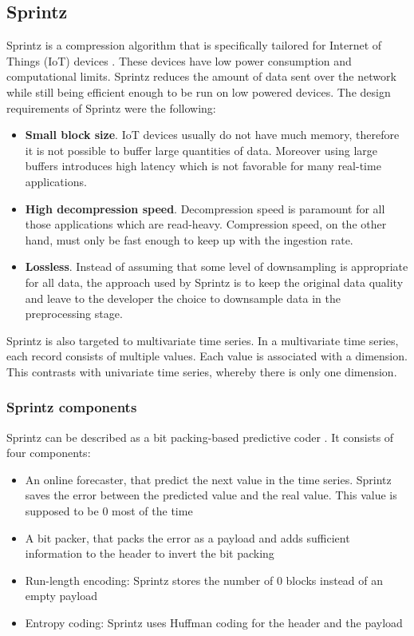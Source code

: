 \subsection{Sprintz}
Sprintz is a compression algorithm that is specifically tailored for Internet of Things (IoT)
devices \cite{Blalock2018Sprintz}. These devices have low power consumption and computational limits. Sprintz
reduces the amount of data sent over the network while still being efficient enough to be
run on low powered devices. The design requirements of Sprintz were the following:
\begin{itemize}
    \item \textbf{Small block size}. IoT devices usually do not have much memory, therefore it is not
    possible to buffer large quantities of data. Moreover using large buffers introduces high
    latency which is not favorable for many real-time applications.

    \item \textbf{High decompression speed}. Decompression speed is paramount for all those applications
    which are read-heavy. Compression speed, on the other hand, must only be fast enough to
    keep up with the ingestion rate.
    
    \item \textbf{Lossless}. Instead of assuming that some level of downsampling is appropriate for
    all data, the approach used by Sprintz is to keep the original data quality and leave to
    the developer the choice to downsample data in the preprocessing stage.
\end{itemize}
Sprintz is also targeted to multivariate time series. In a multivariate time series,
each record consists of multiple values. Each value is associated with a dimension. This
contrasts with univariate time series, whereby there is only one dimension.

\subsubsection{Sprintz components}
Sprintz can be described as a bit packing-based predictive coder \cite{Blalock2018Sprintz}.
It consists of four components:
\begin{itemize}
    \item An online forecaster, that predict the next value in the time series. Sprintz
    saves the error between the predicted value and the real value. This value is supposed
    to be 0 most of the time
    \item A bit packer, that packs the error as a payload and adds sufficient information
    to the header to invert the bit packing
    \item Run-length encoding: Sprintz stores the number of 0 blocks instead of an empty
    payload
    \item Entropy coding: Sprintz uses Huffman coding for the header and the payload
\end{itemize}

